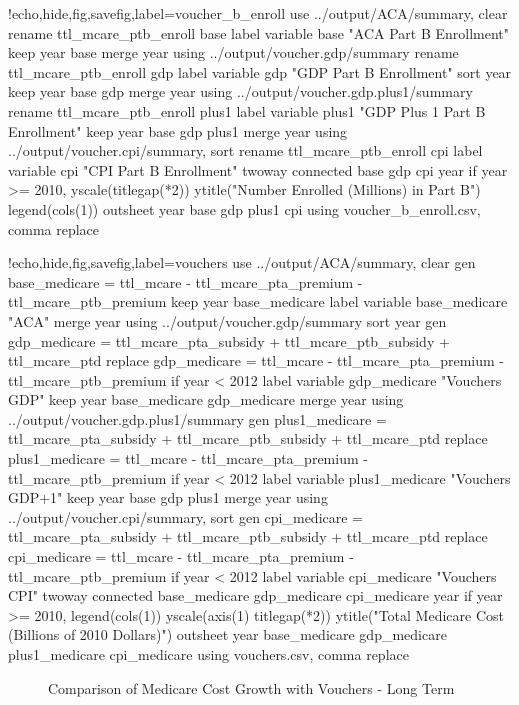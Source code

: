 \documentclass{article}
\begin{document}
\begin{Statacode}{!echo,hide,fig,savefig,label=voucher_b_enroll}
use ../output/ACA/summary, clear
rename ttl_mcare_ptb_enroll base
label variable base "ACA Part B Enrollment"
keep year base
merge year using ../output/voucher.gdp/summary
rename ttl_mcare_ptb_enroll gdp
label variable gdp "GDP Part B Enrollment"
sort year
keep year base gdp
merge year using ../output/voucher.gdp.plus1/summary
rename ttl_mcare_ptb_enroll plus1
label variable plus1 "GDP Plus 1 Part B Enrollment"
keep year base gdp plus1
merge year using ../output/voucher.cpi/summary, sort
rename ttl_mcare_ptb_enroll cpi
label variable cpi "CPI Part B Enrollment"
twoway connected base gdp cpi year if year >= 2010, yscale(titlegap(*2)) ytitle("Number Enrolled (Millions) in Part B") legend(cols(1))
outsheet year base gdp plus1 cpi using voucher_b_enroll.csv, comma replace
\end{Statacode}

\begin{Statacode}{!echo,hide,fig,savefig,label=vouchers}
use ../output/ACA/summary, clear
gen base_medicare = ttl_mcare - ttl_mcare_pta_premium - ttl_mcare_ptb_premium
keep year base_medicare
label variable base_medicare "ACA"
merge year using ../output/voucher.gdp/summary
sort year
gen gdp_medicare = ttl_mcare_pta_subsidy + ttl_mcare_ptb_subsidy + ttl_mcare_ptd
replace gdp_medicare = ttl_mcare - ttl_mcare_pta_premium - ttl_mcare_ptb_premium if year < 2012
label variable gdp_medicare "Vouchers GDP"
keep year base_medicare gdp_medicare
merge year using ../output/voucher.gdp.plus1/summary
gen plus1_medicare = ttl_mcare_pta_subsidy + ttl_mcare_ptb_subsidy + ttl_mcare_ptd
replace plus1_medicare = ttl_mcare - ttl_mcare_pta_premium - ttl_mcare_ptb_premium if year < 2012
label variable plus1_medicare "Vouchers GDP+1"
keep year base gdp plus1
merge year using ../output/voucher.cpi/summary, sort
gen cpi_medicare = ttl_mcare_pta_subsidy + ttl_mcare_ptb_subsidy + ttl_mcare_ptd
replace cpi_medicare = ttl_mcare - ttl_mcare_pta_premium - ttl_mcare_ptb_premium if year < 2012
label variable cpi_medicare "Vouchers CPI"
twoway connected base_medicare gdp_medicare cpi_medicare year if year >= 2010, legend(cols(1)) yscale(axis(1) titlegap(*2)) ytitle("Total Medicare Cost (Billions of 2010 Dollars)")
outsheet year base_medicare gdp_medicare plus1_medicare cpi_medicare using vouchers.csv, comma replace
\end{Statacode}

\begin{figure}[ht]
\centering
{}
\caption{Comparison of Medicare Cost Growth with Vouchers - Long Term}
\label{fig:vouchers}
\end{figure}
\end{document}
